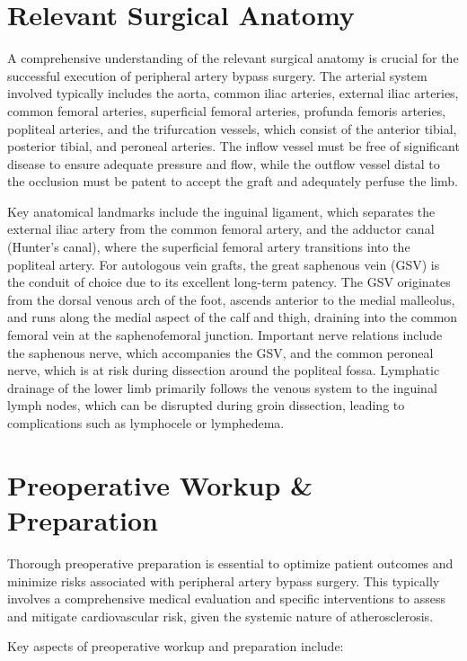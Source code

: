 \section*{Relevant Surgical Anatomy}
A comprehensive understanding of the relevant surgical anatomy is crucial for the successful execution of peripheral artery bypass surgery. The arterial system involved typically includes the aorta, common iliac arteries, external iliac arteries, common femoral arteries, superficial femoral arteries, profunda femoris arteries, popliteal arteries, and the trifurcation vessels, which consist of the anterior tibial, posterior tibial, and peroneal arteries. The inflow vessel must be free of significant disease to ensure adequate pressure and flow, while the outflow vessel distal to the occlusion must be patent to accept the graft and adequately perfuse the limb.

Key anatomical landmarks include the inguinal ligament, which separates the external iliac artery from the common femoral artery, and the adductor canal (Hunter's canal), where the superficial femoral artery transitions into the popliteal artery. For autologous vein grafts, the great saphenous vein (GSV) is the conduit of choice due to its excellent long-term patency. The GSV originates from the dorsal venous arch of the foot, ascends anterior to the medial malleolus, and runs along the medial aspect of the calf and thigh, draining into the common femoral vein at the saphenofemoral junction. Important nerve relations include the saphenous nerve, which accompanies the GSV, and the common peroneal nerve, which is at risk during dissection around the popliteal fossa. Lymphatic drainage of the lower limb primarily follows the venous system to the inguinal lymph nodes, which can be disrupted during groin dissection, leading to complications such as lymphocele or lymphedema.

\section*{Preoperative Workup \& Preparation}
Thorough preoperative preparation is essential to optimize patient outcomes and minimize risks associated with peripheral artery bypass surgery. This typically involves a comprehensive medical evaluation and specific interventions to assess and mitigate cardiovascular risk, given the systemic nature of atherosclerosis.

Key aspects of preoperative workup and preparation include:

